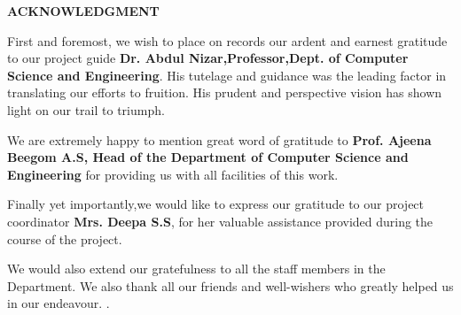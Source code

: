 \documentclass[12pt]{report}
\begin{document}
\newpage
\thispagestyle{empty}
\begin{center}
\textsc{\bf ACKNOWLEDGMENT}
\end{center}
\vspace{20mm}
\begin{spacing}{1.5}
First and foremost, we wish to place on records our ardent and earnest gratitude to our project guide {\bf Dr. Abdul Nizar,Professor,Dept. of Computer Science and Engineering}. His tutelage and guidance was the leading factor in translating our efforts to fruition. His prudent and perspective vision has shown light on our trail to triumph.

We are extremely happy to mention great word of gratitude to {\bf Prof. Ajeena Beegom A.S, Head of the Department of Computer Science and Engineering} for providing us with all facilities of this work.

Finally yet importantly,we would like to express our gratitude to our project coordinator {\bf Mrs. Deepa S.S}, for her valuable assistance provided during the course of the project.

We would also extend our gratefulness to all the staff members in the Department. We also thank all our friends and well-wishers who greatly helped us in our endeavour.
.\\
\end{spacing}
\vspace{15mm}
{}

\newpage
{
\pagestyle{empty}
\tableofcontents
\listoffigures
\listoftables
\cleardoublepage
}

\pagestyle{fancy}








\end{document}
